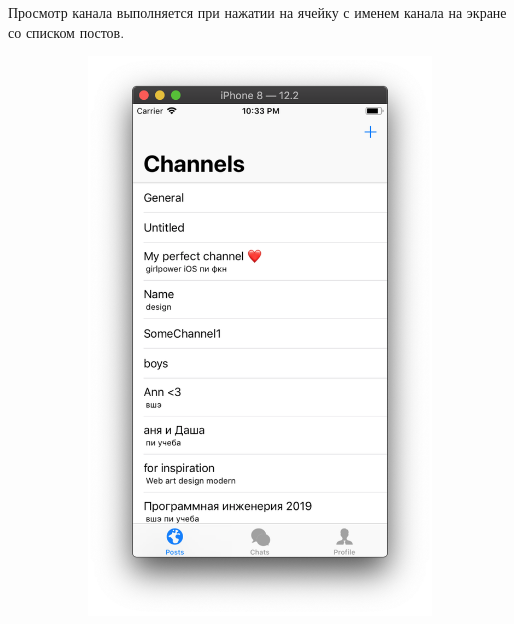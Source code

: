 \documentclass[a4paper,12pt]{article}
\begin{document}
	Просмотр канала выполняется при нажатии на ячейку с именем канала на экране со списком постов.
	
	\begin{figure}[h!]
		\centering
	\begin{subfigure}[b]{0.3\linewidth}
		\includegraphics[width=\linewidth]{../includes/pmi/channel_list.png}
	\end{subfigure}
	\begin{subfigure}[b]{0.3\linewidth}

\end{subfigure}
\end{figure}
\end{document}
